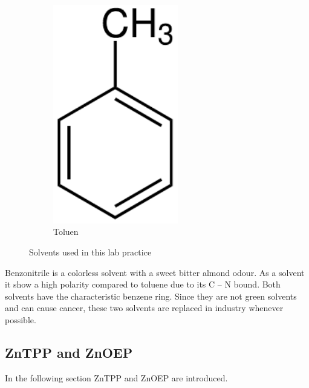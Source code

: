 \begin{figure}[h]
\begin{subfigure}[b]{0.3\textwidth}
      \includegraphics[width = 0.6\textwidth]{Bilder/Grundlagen/Toluen.pdf}      
      \caption{Toluen}
      \label{fig:Tol}
    \end{subfigure}
    \caption{Solvents used in this lab practice}
    \label{fig:Solvents}
\end{figure}

Benzonitrile is a colorless solvent with a sweet bitter almond odour. As a solvent it show a high polarity compared to toluene due to its C -- N bound. 
Both solvents have the characteristic benzene ring. Since they are not green solvents and can cause cancer, these two solvents are replaced in industry whenever possible. 

\subsection{ZnTPP and ZnOEP}
\label{subsec:ZnTPPZnOEP}

In the following section ZnTPP and ZnOEP are introduced.



